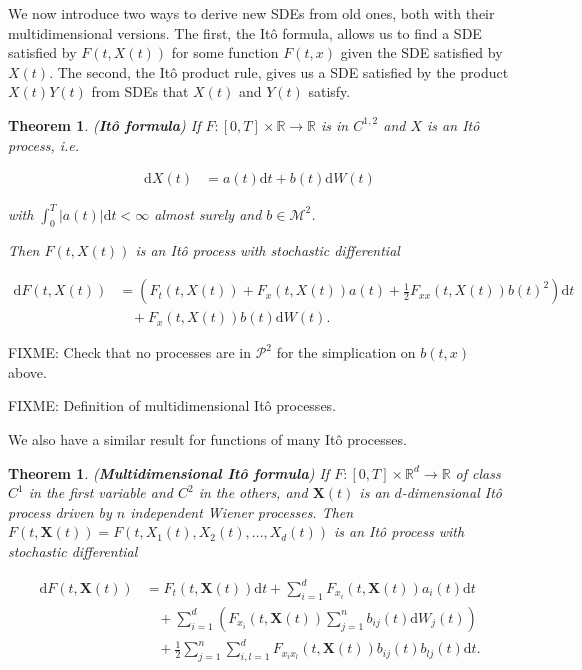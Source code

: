 \documentclass[a4paper]{article}
\newtheorem{theorem}[definition]{Theorem}
\begin{document}
We now introduce two ways to derive new SDEs from old ones, both with their multidimensional versions. The first, the It\^o formula, allows us to find a SDE satisfied by $F(t,X(t))$ for some function $F(t,x)$ given the SDE satisfied by $X(t)$. The second, the It\^o product rule, gives us a SDE satisfied by the product $X(t)Y(t)$ from SDEs that $X(t)$ and $Y(t)$ satisfy.

\begin{theorem}\label{eq:ito-formula}
  (\textbf{It\^o formula}) If $F : [0,T] \times \mathbb{R} \to \mathbb{R}$ is in $C^{1,2}$ and $X$ is an It\^o process, i.e.

  \begin{align*}
    \mathrm{d}X(t) &= a(t) \mathrm{d}t + b(t) \mathrm{d}W(t)
  \end{align*}

  with $\int_0^T |a(t)| \mathrm{d}t < \infty$ almost surely and $b \in \mathcal{M}^2$.

  Then $F(t,X(t))$ is an It\^o process with stochastic differential

  \begin{align*}
    \mathrm{d}F(t,X(t)) &= \left(F_t(t,X(t)) + F_x(t,X(t)) a(t) + \frac{1}{2} F_{xx}(t,X(t)) b(t)^2 \right) \mathrm{d}t\\
    &\ \ \ \ + F_x(t,X(t)) b(t) \mathrm{d}W(t).
  \end{align*}
\end{theorem}

FIXME: Check that no processes are in $\mathcal{P}^2$ for the simplication on $b(t,x)$ above.


FIXME: Definition of multidimensional It\^o processes.

We also have a similar result for functions of many It\^o processes.

\begin{theorem}\label{eq:ito-formula-multi}
  (\textbf{Multidimensional It\^o formula}) If $F : [0,T] \times \mathbb{R}^d \to \mathbb{R}$ of class $C^1$ in the first variable and $C^2$ in the others, and $\mathbf{X}(t)$ is an $d$-dimensional It\^o process driven by $n$ independent Wiener processes. Then $F(t,\mathbf{X}(t)) = F(t,X_1(t),X_2(t),\ldots,X_d(t))$ is an It\^o process with stochastic differential

  \begin{align*}
    \mathrm{d}F(t,\mathbf{X}(t))
    &= F_t(t,\mathbf{X}(t)) \mathrm{d}t + \sum_{i=1}^d F_{x_i}(t,\mathbf{X}(t)) a_i(t) \mathrm{d}t\\
    &\ \ \ \ + \sum_{i=1}^d \left(F_{x_i}(t,\mathbf{X}(t)) \sum_{j=1}^n b_{ij}(t) \mathrm{d}W_j(t) \right)\\
    &\ \ \ \ + \frac{1}{2} \sum_{j=1}^n \sum_{i,l=1}^d F_{x_i x_l}(t,\mathbf{X}(t)) b_{ij}(t)b_{lj}(t) \mathrm{d}t.
  \end{align*}
\end{theorem}
\end{document}
